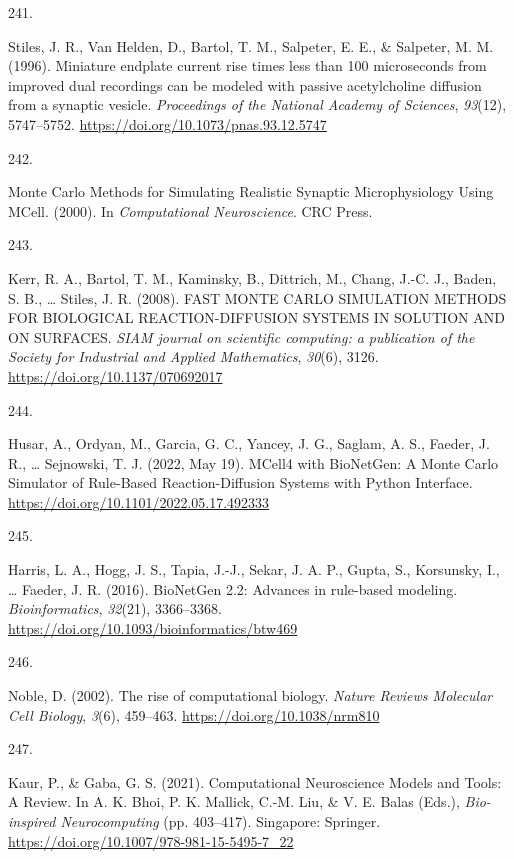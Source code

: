 \documentclass[
  11pt,
  letterpaper,
]{scrreprt}
\newlength{\cslhangindent}
\newlength{\csllabelwidth}
\newenvironment{CSLReferences}[2] %
 {\begin{list}{}{%
  \setlength{\itemindent}{0pt}
  \setlength{\leftmargin}{0pt}
  \setlength{\parsep}{0pt}
  \ifodd #1
   \setlength{\leftmargin}{\cslhangindent}
   \setlength{\itemindent}{-1\cslhangindent}
  \fi
  \setlength{\itemsep}{#2\baselineskip}}}
 {\end{list}}
\newcommand{\CSLLeftMargin}[1]{\parbox[t]{\csllabelwidth}{\strut#1\strut}}
\newcommand{\CSLRightInline}[1]{\parbox[t]{\linewidth - \csllabelwidth}{\strut#1\strut}}
\begin{document}
\begin{CSLReferences}{0}{0}
\CSLLeftMargin{241. }%
\CSLRightInline{Stiles, J. R., Van Helden, D., Bartol, T. M., Salpeter,
E. E., \& Salpeter, M. M. (1996). Miniature endplate current rise times
less than 100 microseconds from improved dual recordings can be modeled
with passive acetylcholine diffusion from a synaptic vesicle.
\emph{Proceedings of the National Academy of Sciences}, \emph{93}(12),
5747--5752. \url{https://doi.org/10.1073/pnas.93.12.5747}}

\CSLLeftMargin{242. }%
\CSLRightInline{Monte {Carlo Methods} for {Simulating Realistic Synaptic
Microphysiology Using MCell}. (2000). In \emph{Computational
{Neuroscience}}. CRC Press.}

\CSLLeftMargin{243. }%
\CSLRightInline{Kerr, R. A., Bartol, T. M., Kaminsky, B., Dittrich, M.,
Chang, J.-C. J., Baden, S. B., \ldots{} Stiles, J. R. (2008). {FAST
MONTE CARLO SIMULATION METHODS FOR BIOLOGICAL REACTION-DIFFUSION SYSTEMS
IN SOLUTION AND ON SURFACES}. \emph{SIAM journal on scientific
computing: a publication of the Society for Industrial and Applied
Mathematics}, \emph{30}(6), 3126.
\url{https://doi.org/10.1137/070692017}}

\CSLLeftMargin{244. }%
\CSLRightInline{Husar, A., Ordyan, M., Garcia, G. C., Yancey, J. G.,
Saglam, A. S., Faeder, J. R., \ldots{} Sejnowski, T. J. (2022, May 19).
{MCell4} with {BioNetGen}: {A Monte Carlo Simulator} of {Rule-Based
Reaction-Diffusion Systems} with {Python Interface}.
\url{https://doi.org/10.1101/2022.05.17.492333}}

\CSLLeftMargin{245. }%
\CSLRightInline{Harris, L. A., Hogg, J. S., Tapia, J.-J., Sekar, J. A.
P., Gupta, S., Korsunsky, I., \ldots{} Faeder, J. R. (2016). {BioNetGen}
2.2: Advances in rule-based modeling. \emph{Bioinformatics},
\emph{32}(21), 3366--3368.
\url{https://doi.org/10.1093/bioinformatics/btw469}}

\CSLLeftMargin{246. }%
\CSLRightInline{Noble, D. (2002). The rise of computational biology.
\emph{Nature Reviews Molecular Cell Biology}, \emph{3}(6), 459--463.
\url{https://doi.org/10.1038/nrm810}}

\CSLLeftMargin{247. }%
\CSLRightInline{Kaur, P., \& Gaba, G. S. (2021). Computational
{Neuroscience Models} and {Tools}: {A Review}. In A. K. Bhoi, P. K.
Mallick, C.-M. Liu, \& V. E. Balas (Eds.), \emph{Bio-inspired
{Neurocomputing}} (pp. 403--417). Singapore: Springer.
\url{https://doi.org/10.1007/978-981-15-5495-7_22}}


\end{CSLReferences}
\end{document}
